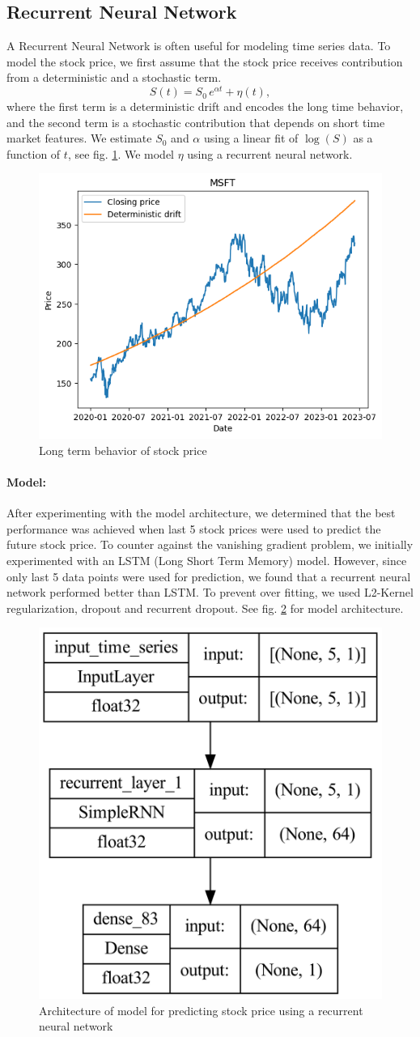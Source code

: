 \documentclass[11pt]{article}
\begin{document}
\subsection{Recurrent Neural Network}
A Recurrent Neural Network is often useful for modeling time series data. To model the stock price, we first assume that the stock price receives contribution from a deterministic and a stochastic term. 
\begin{equation}
	S(t) = S_0 \, e^{\alpha t} + \eta(t),
\end{equation}
where the first term is a deterministic drift and encodes the long time behavior, and the second term is a stochastic contribution that depends on short time market features. We estimate $S_0$ and $\alpha$ using a linear fit of $\log(S)$ as a function of $t$, see fig. \ref{fig_drift}. We model $\eta$ using a recurrent neural network. 
\begin{figure}[h]
	\centering
	\includegraphics[width = .75\linewidth]{graphics/drift.png}
	\caption{Long term behavior of stock price}
	\label{fig_drift}
\end{figure}
\paragraph{Model:}{After experimenting with the model architecture, we determined that the best performance was achieved when last 5 stock prices were used to predict the future stock price. To counter against the vanishing gradient problem, we initially experimented with an LSTM (Long Short Term Memory) model. However, since only last 5 data points were used for prediction, we found that a recurrent neural network performed better than LSTM. To prevent over fitting, we used L2-Kernel regularization, dropout and recurrent dropout. See fig. \ref{fig_simplernn_model} for model architecture.}
\begin{figure}
	\centering
	\includegraphics[width=.25\linewidth]{graphics/simplernn_model}
	\caption{Architecture of model for predicting stock price using a recurrent neural network}
	\label{fig_simplernn_model}
\end{figure}
\end{document}
